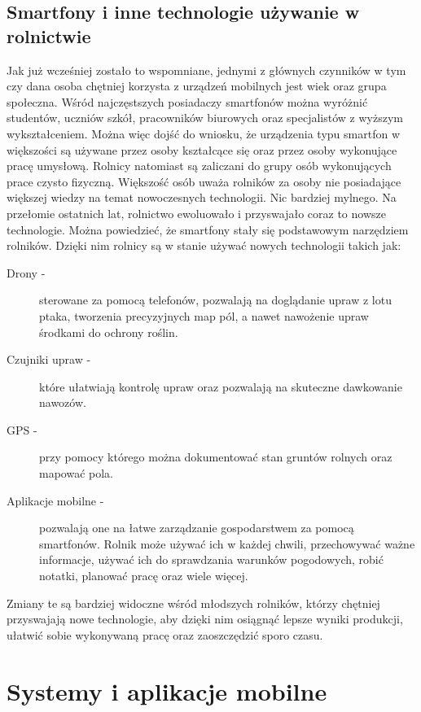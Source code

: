 \documentclass[a4paper,12pt,oneside]{book}
\begin{document}
	\section{Smartfony i inne technologie używanie w rolnictwie}
	Jak już wcześniej zostało to wspomniane, jednymi z głównych czynników w tym czy dana osoba chętniej korzysta z urządzeń mobilnych jest wiek oraz grupa społeczna. Wśród najczęstszych posiadaczy smartfonów można wyróżnić studentów, uczniów szkół, pracowników biurowych oraz specjalistów z wyższym wykształceniem. Można więc dojść do wniosku, że urządzenia typu smartfon w większości są używane przez osoby kształcące się oraz przez osoby wykonujące pracę umysłową. Rolnicy natomiast są zaliczani do grupy osób wykonujących prace czysto fizyczną. Większość osób uważa rolników za osoby nie posiadające większej wiedzy na temat nowoczesnych technologii. Nic bardziej mylnego. Na przełomie ostatnich lat, rolnictwo ewoluowało i przyswajało coraz to nowsze technologie. Można powiedzieć, że smartfony stały się podstawowym narzędziem rolników. Dzięki nim rolnicy są w stanie używać nowych technologii takich jak:
	
	\begin{description}
		\item[Drony -] sterowane za pomocą telefonów, pozwalają na doglądanie upraw z lotu ptaka, tworzenia precyzyjnych map pól, a nawet nawożenie upraw środkami do ochrony roślin.
		\item[Czujniki upraw -] które ułatwiają kontrolę upraw oraz pozwalają na skuteczne dawkowanie nawozów.
		\item[GPS -] przy pomocy którego można dokumentować stan gruntów rolnych oraz mapować pola.
		\item[Aplikacje mobilne -] pozwalają one na łatwe zarządzanie gospodarstwem za pomocą smartfonów. Rolnik może używać ich w każdej chwili, przechowywać ważne informacje, używać ich do sprawdzania warunków pogodowych, robić notatki, planować pracę oraz wiele więcej.
	\end{description}

	Zmiany te są bardziej widoczne wśród młodszych rolników, którzy chętniej przyswajają nowe technologie, aby dzięki nim osiągnąć lepsze wyniki produkcji, ułatwić sobie wykonywaną pracę oraz zaoszczędzić sporo czasu.
	
	\newpage
	\thispagestyle{empty}
	\chapter{Systemy i aplikacje mobilne}
\end{document}
